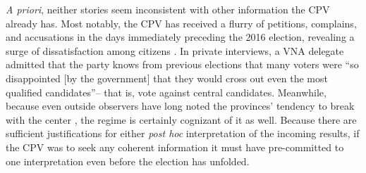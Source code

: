 \documentclass[12pt]{article}
\newcommand\fnote[1]{\footnote{\baselineskip=2\normalbaselineskip#1}}
\newcommand{\1}{\mathbbm{1}}
\let\footnote=\endnote
\begin{document}
\textit{A priori}, neither stories seem inconsistent with other information the CPV already has. Most notably, the CPV has received a flurry of petitions, complains, and accusations in the days immediately preceding the 2016 election, revealing a surge of dissatisfaction among citizens \citep{BaoChinhPhu2016}. 
In private interviews, a VNA delegate admitted that the party knows from previous elections that many voters were ``so disappointed [by the government] that they would cross out even the most qualified candidates''-- that is, vote against central candidates. 
Meanwhile, because even outside observers have long noted the provinces' tendency to break with the center \citep{MaleskySchuler2013}, the regime is certainly cognizant of it as well. 
Because there are sufficient justifications for either \textit{post hoc} interpretation of the incoming results, if the CPV was to seek any coherent information it must have pre-committed to one interpretation even before the election has unfolded.
\end{document}
